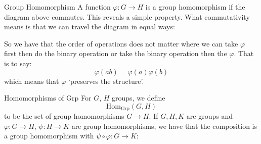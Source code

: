 \documentclass{report}
\begin{document}
\begin{definition}[\label{def:2.3.1}]{Group Homomorphism}
    A function $\varphi : G \rightarrow H$ is a group homomorphism if the diagram above commutes. This reveals a simple property. What commutativity means is that we can travel the diagram in equal ways:
        \begin{center}
                \hspace{30pt} 
        \end{center}
    So we have that the order of operations does not matter where we can take $\varphi$ first then do the binary operation or take the binary operation then the $\varphi$. That is to say:
        \begin{equation*}
            \varphi(ab) = \varphi(a)\varphi(b)
        \end{equation*}
    which means that $\varphi$ `preserves the structure'.
\end{definition}

\begin{definition}[\label{def:2.3.2}]{Homomorphisms of Grp}
    For $G$, $H$ groups, we define 
        \begin{equation*}
            \text{Hom}_{\text{Grp}}(G, H)
        \end{equation*}
    to be the set of group homomorphisms $G \rightarrow H$. If $G, H, K$ are groups and $\varphi: G \rightarrow H$, $\psi : H \rightarrow K$ are group homomorphisms, we have that the composition is a group homomorphism with $\psi \circ \varphi: G \rightarrow K$:
    \begin{center}
    \end{center}
\end{definition}
\end{document}
